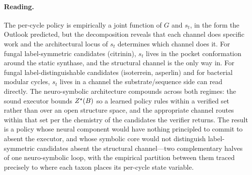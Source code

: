 \paragraph{Reading.} The per-cycle policy is empirically a joint function of $G$ and
$s_t$, in the form the Outlook predicted, but the decomposition reveals that each
channel does specific work and the architectural locus of $s_t$ determines which channel
does it. For fungal label-symmetric candidates (citrinin), $s_t$ lives in the pocket
conformation around the static synthase, and the structural channel is the only
way in. For fungal label-distinguishable candidates (isoterrein, asperlin) and for
bacterial modular cycles, $s_t$ lives in a channel the substrate/sequence side can read
directly. The neuro-symbolic architecture compounds across both regimes: the sound
executor bounds $Z^{\star}(B)$ so a learned policy rules within a verified set rather than
over an open structure space, and the appropriate channel routes within that set per
the chemistry of the candidates the verifier returns. The result is a policy whose
neural component would have nothing principled to commit to absent the executor, and
whose symbolic core would not distinguish label-symmetric candidates absent the
structural channel---two complementary halves of one neuro-symbolic loop, with the
empirical partition between them traced precisely to where each taxon places its
per-cycle state variable.

